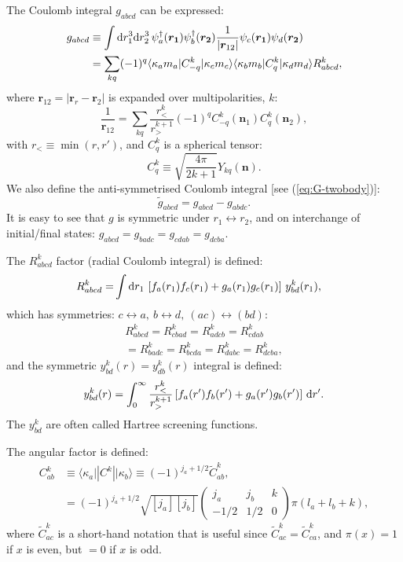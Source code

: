 \documentclass[10pt,twocolumn,a4paper]{article}%
\newcommand{\bra}[1]{\ensuremath{\langle #1|}}	%
\newcommand{\ket}[1]{\ensuremath{|#1\rangle}}	%
\newcommand{\threej}[6]{\ensuremath{\begin{pmatrix}#1&#2&#3\\#4&#5&#6\end{pmatrix}}}	%
\renewcommand{\v}[1]{\ensuremath{\boldsymbol{#1}}}		%
\newcommand{\be}{\begin{equation}}
\newcommand{\ee}{\end{equation}}
\def\d{\ensuremath{{\rm d}}}
\newcommand{\psidag}{\ensuremath{\psi^\dagger}}	%
\renewcommand{\k}{\ensuremath{\kappa}}
\begin{document}
The Coulomb integral $g_{abcd}$ can be expressed:
\begin{align}\label{eq:gabcd}
g_{abcd} &\equiv \int\d r_1^3\d r_2^3 \, \psidag_a(\v{r_1})\psidag_b(\v{r_2})\frac{1}{|\v{r}_{12}|}\psi_c(\v{r_1})\psi_d(\v{r_2}) \\
& = \sum_{kq} (-1)^q \bra{\k_a m_a}C^k_{-q}\ket{\k_c m_c} \bra{\k_b m_b}C^k_{q}\ket{\k_d m_d} R^k_{abcd},\notag
\end{align}
where $\v{r}_{12}=|\v{r}_r-\v{r}_2|$ is expanded over multipolarities, $k$:
\be
\frac{1}{\v{r}_{12}} = \sum_{kq} \frac{r_<^k}{r_>^{k+1}}(-1)^q C^k_{-q}(\v{n}_1)C^k_{q}(\v{n}_2),
\ee
with $r_{<} \equiv \min(r,r')$, and $C^k_{q}$ is a spherical tensor:
\be
C^k_{q} \equiv \sqrt{\frac{4\pi}{2k+1}}Y_{kq}(\v{n}).
\ee
We also define the anti-symmetrised Coulomb integral [see (\ref{eq:G-twobody})]:
\be
 \widetilde g_{abcd} =  g_{abcd} -  g_{abdc}.
\ee
It is easy to see that $g$ is symmetric under $r_1\leftrightarrow r_2$, and on interchange of initial/final states:
$g_{abcd} = g_{badc} = g_{cdab} = g_{dcba}$.


The $R^k_{abcd}$ factor (radial Coulomb integral) is defined:
\begin{align}
R^k_{abcd} =& \int\d r_1 \, \left[f_a(r_1)f_c(r_1) + g_a(r_1)g_c(r_1)\right]\, y^k_{bd}(r_1),
\end{align}
which has symmetries: $c\leftrightarrow a ,~ b\leftrightarrow d  ,~ (ac)\leftrightarrow (bd)$:
\begin{multline}
 R^k_{abcd} =R^k_{cbad} =R^k_{adcb} =R^k_{cdab} \\=R^k_{badc} =R^k_{bcda} =R^k_{dabc} =R^k_{dcba},
\end{multline}
and the symmetric $y^k_{bd}(r) = y^k_{db}(r)$ integral is defined:
\be
y^k_{bd}(r) = \int_0^\infty \frac{r_<^k}{r_>^{k+1}}\left[f_a(r') f_b(r') + g_a(r') g_b(r')\right]\, \d r'.
\ee
The $y^k_{bd}$ are often called Hartree screening functions.

The angular factor is defined:
\begin{align}
C^k_{ab}&\equiv \bra{\k_a}|C^k|\ket{\k_b} \equiv  (-1)^{j_a+1/2} \widetilde C^k_{ab} ,\\
&= (-1)^{j_a+1/2}\sqrt{[j_a][j_b]}\threej{j_a}{j_b}{k}{-1/2}{1/2}{0}\pi(l_a+l_b+k) ,
\end{align}
where $\widetilde C^k_{ac}$
 is a short-hand notation that is useful since $\widetilde C^k_{ac} = \widetilde C^k_{ca}$, and $\pi(x)=1$ if $x$ is even, but $=0$ if $x$ is odd.
\end{document}
